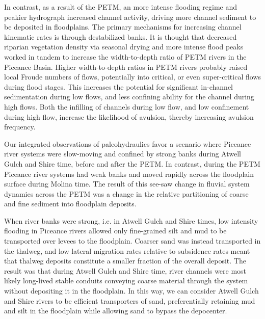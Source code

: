 \documentclass[draft]{compact_proposal}
\begin{document}
In contrast, as a result of the PETM, an more intense flooding regime and peakier hydrograph increased channel activity, driving more channel sediment to be deposited in floodplains.
The primary mechanisms for increasing channel kinematic rates is through destabilized banks.
It is thought that decreased riparian vegetation density via seasonal drying and more intense flood peaks worked in tandem to increase the width-to-depth ratio of PETM rivers in the Piceance Basin.
Higher width-to-depth ratios in PETM rivers probably raised local Froude numbers of flows, potentially into critical, or even super-critical flows during flood stages.
This increases the potential for significant in-channel sedimentation during low flows, and less confining ability for the channel during high flows.
Both the infilling of channels during low flow, and low confinement during high flow, increase the likelihood of avulsion, thereby increasing avulsion frequency.

Our integrated observations of paleohydraulics favor a scenario where Piceance river systems were slow-moving and confined by strong banks during Atwell Gulch and Shire time, before and after the PETM.
In contrast, during the PETM Piceance river systems had weak banks and moved rapidly across the floodplain surface during Molina time.
The result of this see-saw change in fluvial system dynamics across the PETM was a change in the relative partitioning of coarse and fine sediment into floodplain deposits.

When river banks were strong, i.e. in Atwell Gulch and Shire times, low intensity flooding in Piceance rivers allowed only fine-grained silt and mud to be transported over levees to the floodplain.
Coarser sand was instead transported in the thalweg, and low lateral migration rates relative to subsidence rates meant that thalweg deposits constitute a smaller fraction of the overall deposit.
The result was that during Atwell Gulch and Shire time, river channels were most likely long-lived stable conduits conveying coarse material through the system without depositing it in the floodplain.
In this way, we can consider Atwell Gulch and Shire rivers to be efficient transporters of sand, preferentially retaining mud and silt in the floodplain while allowing sand to bypass the depocenter.
\end{document}
